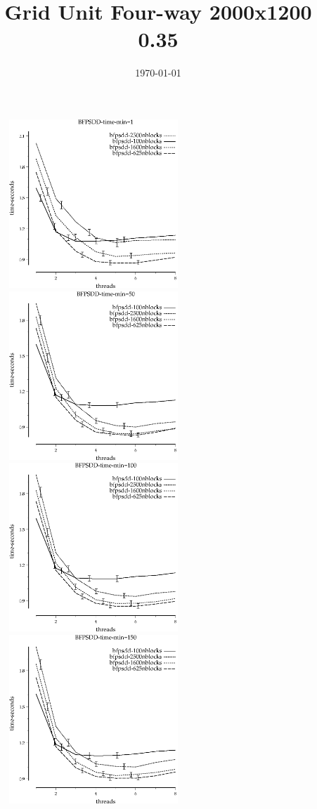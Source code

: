 \documentclass{article}
\title{Grid Unit Four-way 2000x1200 0.35}
\date{\today}
\begin{document}
\maketitle

\begin{figure}
\begin{center}
\includegraphics[width=2.5in]{BFPSDD-time-min=1}
\includegraphics[width=2.5in]{BFPSDD-time-min=50}
\includegraphics[width=2.5in]{BFPSDD-time-min=100}
\includegraphics[width=2.5in]{BFPSDD-time-min=150}

\end{center}
\end{figure}
\end{document}
